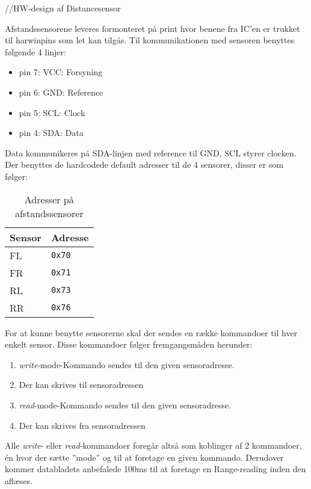 //HW-design af Distancesensor

Afstandssensorene leveres formonteret på print hvor benene fra IC'en er trukket til harwinpins som let kan tilgås. Til kommunikationen med sensoren benyttes følgende 4 linjer: 

\begin{itemize}
	\item pin 7: VCC: Forsyning
	\item pin 6: GND: Reference
	\item pin 5: SCL: Clock
	\item pin 4: SDA: Data
\end{itemize}

Data kommunikeres på SDA-linjen med reference til GND,  SCL styrer clocken.
Der benyttes de hardcodede default adresser til de 4 sensorer, disser er som følger: 

\begin{table}[h]\centering
	\begin{tabular}{| l | l |} \hline
		\textbf{Sensor} 	& \textbf{Adresse}  \\\hline
		FL 					& \texttt{0x70} 	\\\hline
		FR 					& \texttt{0x71} 	\\\hline
		RL 					& \texttt{0x73} 	\\\hline
		RR 					& \texttt{0x76} 	\\\hline
	\end{tabular}
	\caption{Adresser på afstandssensorer}
	\label{table:adr_afstandssensorer}
\end{table}

For at kunne benytte sensorerne skal der sendes en række kommandoer til hver enkelt sensor. Disse kommandoer følger fremgangsmåden herunder:

\begin{enumerate}
  \item \textit{write}-mode-Kommando sendes til den given sensoradresse.
  \item Der kan skrives til sensoradressen
  \item \textit{read}-mode-Kommando sendes til den given sensoradresse.
  \item Der kan skrives fra sensoradressen
\end{enumerate}

Alle \textit{write}- eller \textit{read}-kommandoer foregår altså som koblinger af 2 kommandoer, én hvor der sætte ''mode'' og til at foretage en given kommando. Derudover kommer databladets anbefalede 100ms til at foretage en Range-reading inden den aflæses.

